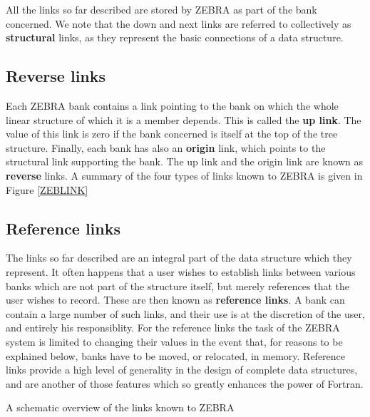 All the links so far described are stored by ZEBRA as part of the bank
concerned. We note that the down and next links are referred to collectively
as {\bf structural} links, as they represent the basic connections
of a data structure.

\subsection{Reverse links}

Each ZEBRA bank contains a link pointing to the bank on which the
whole linear structure of which it is a member depends. 
This is called the {\bf up link}. 
The value of this link is zero if the bank concerned is 
itself at the top of the tree structure.
Finally, each bank has also an {\bf origin} link, which points
to the structural link supporting the bank.
The up link and the origin link are known as {\bf reverse} links.
A summary of the four types of links known to ZEBRA is given in
Figure \ref{ZEBLINK}

\subsection{Reference links}

The links so far described are an integral part of the data structure
which they represent. It often happens that a user wishes to establish
links between various banks which are not part of the structure itself,
but merely references that the user wishes to record.
These are then known as
{\bf reference links}. A bank can contain a large number of such links,
and their use is at the discretion of the user, and entirely his
responsiblity. For the reference links the task of
the ZEBRA system is limited to changing their
values in the event that, for reasons to be explained
below, banks have to be moved, or relocated, in memory. Reference links
provide a high level of generality in the design of complete data
structures, and are another of those features which so greatly
enhances the power of Fortran.

\begin{Fighere}
\begin{center}
\mbox{}
\end{center}
\caption{A schematic overview of the links known to ZEBRA}
\label{ZEBLINK}
\end{Fighere}

